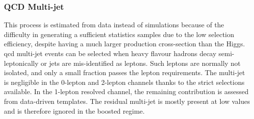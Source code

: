 \subsubsection{QCD Multi-jet}
This process is estimated from data instead of simulations because of the difficulty in generating a sufficient statistics samples due to the low selection efficiency, despite having a much larger production cross-section than the Higgs. \gls{qcd} multi-jet events can be selected when heavy flavour hadrons decay semi-leptonically or jets are mis-identified as leptons. Such leptons are normally not isolated, and only a small fraction passes the lepton requirements. The multi-jet is negligible in the 0-lepton and 2-lepton channels thanks to the strict selections available. In the 1-lepton resolved channel, the remaining contribution is assessed from data-driven templates. The residual multi-jet is mostly present at low \ptv values and is therefore ignored in the boosted regime. \\


